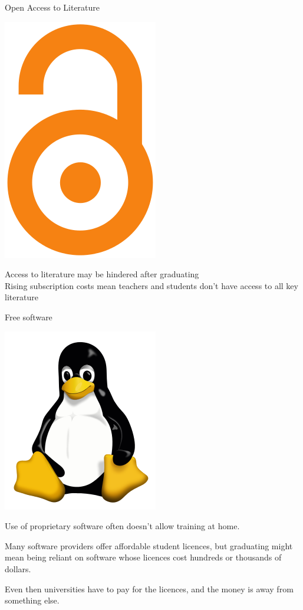 \documentclass{beamer}
\begin{document}
\begin{frame}{Open Access to Literature}
  \begin{center}
    \includegraphics[height = 0.6\textheight]{oalogo.png}
  \end{center}

  Access to literature may be hindered after graduating\\
  Rising subscription costs mean teachers and students don't have access to all key literature
\end{frame}

\begin{frame}{Free software}
  \begin{center}
    \includegraphics[height=0.4\textheight]{tux.png}
  \end{center}
  
  Use of proprietary software often doesn't allow training at home.
  
  Many software providers offer affordable student licences, but graduating might mean being reliant on software whose licences cost hundreds or thousands of dollars.

  Even then universities have to pay for the licences, and the money is away from something else.
\end{frame}
\end{document}
